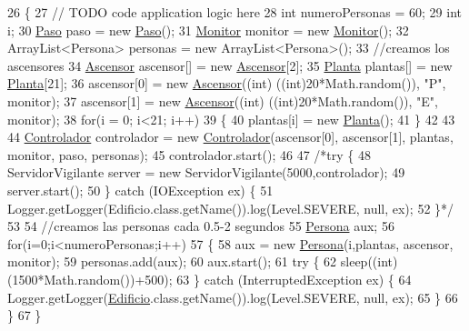 \begin{DoxyCode}
26                                            \{
27         \textcolor{comment}{// TODO code application logic here}
28         \textcolor{keywordtype}{int} numeroPersonas = 60;
29         \textcolor{keywordtype}{int} i;
30         \mbox{\hyperlink{classpecl6part2_1_1_paso}{Paso}} paso = \textcolor{keyword}{new} \mbox{\hyperlink{classpecl6part2_1_1_paso}{Paso}}();
31         \mbox{\hyperlink{classpecl6part1_1_1_monitor}{Monitor}} monitor = \textcolor{keyword}{new} \mbox{\hyperlink{classpecl6part1_1_1_monitor}{Monitor}}();
32         ArrayList<Persona> personas = \textcolor{keyword}{new} ArrayList<Persona>();
33         \textcolor{comment}{//creamos los ascensores}
34         \mbox{\hyperlink{classpecl6part1_1_1_ascensor}{Ascensor}} ascensor[] = \textcolor{keyword}{new} \mbox{\hyperlink{classpecl6part1_1_1_ascensor}{Ascensor}}[2];
35         \mbox{\hyperlink{classpecl6part1_1_1_planta}{Planta}} plantas[] = \textcolor{keyword}{new} \mbox{\hyperlink{classpecl6part1_1_1_planta}{Planta}}[21];
36         ascensor[0] = \textcolor{keyword}{new} \mbox{\hyperlink{classpecl6part1_1_1_ascensor}{Ascensor}}((\textcolor{keywordtype}{int}) ((\textcolor{keywordtype}{int})20*Math.random()), \textcolor{stringliteral}{"P"}, monitor);
37         ascensor[1] = \textcolor{keyword}{new} \mbox{\hyperlink{classpecl6part1_1_1_ascensor}{Ascensor}}((\textcolor{keywordtype}{int}) ((\textcolor{keywordtype}{int})20*Math.random()), \textcolor{stringliteral}{"E"}, monitor);
38         \textcolor{keywordflow}{for}(i = 0; i<21; i++)
39         \{
40             plantas[i] = \textcolor{keyword}{new} \mbox{\hyperlink{classpecl6part1_1_1_planta}{Planta}}();
41         \}
42         
43         
44         \mbox{\hyperlink{classpecl6part1_1_1_controlador}{Controlador}} controlador = \textcolor{keyword}{new} \mbox{\hyperlink{classpecl6part1_1_1_controlador}{Controlador}}(ascensor[0], ascensor[1], plantas, 
      monitor, paso, personas);
45         controlador.start();
46         
47         \textcolor{comment}{/*try \{}
48 \textcolor{comment}{            ServidorVigilante server = new ServidorVigilante(5000,controlador);}
49 \textcolor{comment}{            server.start();}
50 \textcolor{comment}{        \} catch (IOException ex) \{}
51 \textcolor{comment}{            Logger.getLogger(Edificio.class.getName()).log(Level.SEVERE, null, ex);}
52 \textcolor{comment}{        \}*/}
53         
54         \textcolor{comment}{//creamos las personas cada 0.5-2 segundos}
55         \mbox{\hyperlink{classpecl6part1_1_1_persona}{Persona}} aux;
56         \textcolor{keywordflow}{for}(i=0;i<numeroPersonas;i++)
57         \{
58             aux = \textcolor{keyword}{new} \mbox{\hyperlink{classpecl6part1_1_1_persona}{Persona}}(i,plantas, ascensor, monitor);
59             personas.add(aux);
60             aux.start();
61             \textcolor{keywordflow}{try} \{
62                 sleep((\textcolor{keywordtype}{int})(1500*Math.random())+500);
63             \} \textcolor{keywordflow}{catch} (InterruptedException ex) \{
64                 Logger.getLogger(\mbox{\hyperlink{classpecl6part1_1_1_edificio}{Edificio}}.class.getName()).log(Level.SEVERE, null, ex);
65             \}
66         \}
67     \}
\end{DoxyCode}
